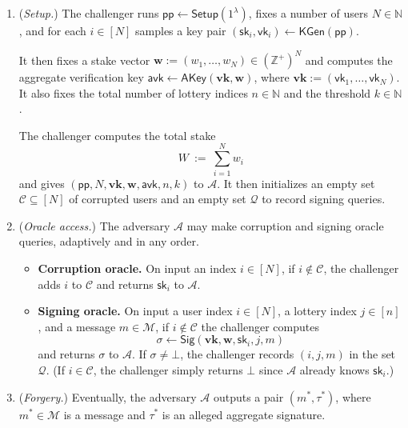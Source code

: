 \documentclass{article}
\newcommand{\sk}[0]{\mathsf{sk}}
\newcommand{\vk}[0]{\mathsf{vk}}
\begin{document}
\begin{enumerate}
    \item (\emph{Setup.})
    The challenger runs $\mathsf{pp} \leftarrow \mathsf{Setup}(1^\lambda)$, fixes a number of users $N \in \mathbb{N}$, and for each $i \in [N]$ samples a key pair
    $(\sk_i,\vk_i) \leftarrow \mathsf{KGen}(\mathsf{pp})$. 
    
    It then fixes a stake vector  $\mathbf{w} := (w_1,\dots,w_N) \in (\mathbb{Z}^+)^N$ and computes the aggregate verification key $\mathsf{avk} \leftarrow \mathsf{AKey}(\mathbf{vk},\mathbf{w})$, where $\mathbf{vk} := (\vk_1,\dots,\vk_N)$. It also fixes the total number of lottery indices $n \in \mathbb{N}$ and the threshold $k \in \mathbb{N}$. 
    
    The challenger computes the total stake
    \[
      W \ :=\ \sum_{i=1}^N w_i
    \]
    and gives $(\mathsf{pp}, N, \mathbf{vk}, \mathbf{w}, \mathsf{avk}, n, k)$ to $\mathcal{A}$. It then initializes an empty set $\mathcal{C} \subseteq [N]$ of corrupted users and an empty set $\mathcal{Q}$ to record signing queries. %
    
    \item (\emph{Oracle access.})
    The adversary $\mathcal{A}$ may make corruption and signing oracle queries, adaptively and in any order.
    \begin{itemize}
        \item \textbf{Corruption oracle.}
        On input an index $i \in [N]$, if $i \notin \mathcal{C}$, the challenger adds $i$ to $\mathcal{C}$ and returns $\sk_i$ to $\mathcal{A}$.
        
        \item \textbf{Signing oracle.}
        On input a user index $i \in [N]$, a lottery index $j \in [n]$, and a message $m \in \mathcal{M}$, if $i \notin \mathcal{C}$ the challenger computes
        \[
          \sigma \leftarrow \mathsf{Sig}(\mathbf{vk}, \mathbf{w}, \sk_i, j, m)
        \]
        and returns $\sigma$ to $\mathcal{A}$. If $\sigma \neq \bot$, the challenger records $(i,j,m)$ in the set $\mathcal{Q}$.
        (If $i \in \mathcal{C}$, the challenger simply returns $\bot$ since $\mathcal{A}$ already knows $\sk_i$.)
    \end{itemize}
    
    \item (\emph{Forgery.})
    Eventually, the adversary $\mathcal{A}$ outputs a pair $(m^\ast,\tau^\ast)$, where $m^\ast \in \mathcal{M}$ is a message and $\tau^\ast$ is an alleged aggregate signature.
    

\end{enumerate}
\end{document}
